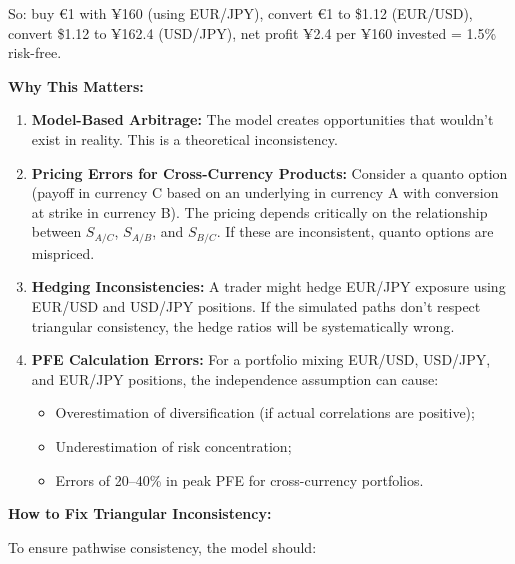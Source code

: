 So: buy €1 with ¥160 (using EUR/JPY), convert €1 to \$1.12 (EUR/USD), convert \$1.12 to ¥162.4 (USD/JPY), net profit ¥2.4 per ¥160 invested = 1.5\% risk-free.

\textbf{Why This Matters:}

\begin{enumerate}
	\item \textbf{Model-Based Arbitrage:} The model creates opportunities that wouldn't exist in reality. This is a theoretical inconsistency.
	
	\item \textbf{Pricing Errors for Cross-Currency Products:} Consider a quanto option (payoff in currency C based on an underlying in currency A with conversion at strike in currency B). The pricing depends critically on the relationship between $S_{A/C}$, $S_{A/B}$, and $S_{B/C}$. If these are inconsistent, quanto options are mispriced.
	
	\item \textbf{Hedging Inconsistencies:} A trader might hedge EUR/JPY exposure using EUR/USD and USD/JPY positions. If the simulated paths don't respect triangular consistency, the hedge ratios will be systematically wrong.
	
	\item \textbf{PFE Calculation Errors:} For a portfolio mixing EUR/USD, USD/JPY, and EUR/JPY positions, the independence assumption can cause:
	\begin{itemize}
		\item Overestimation of diversification (if actual correlations are positive);
		\item Underestimation of risk concentration;
		\item Errors of 20--40\% in peak PFE for cross-currency portfolios.
	\end{itemize}
\end{enumerate}

\textbf{How to Fix Triangular Inconsistency:}

To ensure pathwise consistency, the model should:

